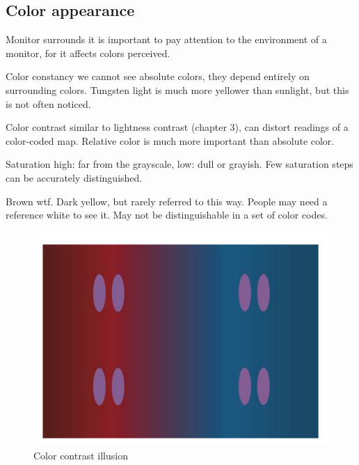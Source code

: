 \begin{mdframed}\begin{multicols}{2}
\subsection{Color appearance}
\begin{compactdesc}
    \item[Monitor surrounds] it is important to pay attention to the environment
        of a monitor, for it affects colors perceived.
    \item[Color constancy] we cannot see absolute colors, they depend entirely
        on surrounding colors. Tungsten light is much more yellower than
        sunlight, but this is not often noticed.
    \item[Color contrast] similar to lightness contrast (chapter 3), can
        distort readings of a color-coded map. Relative color is much more
        important than absolute color.
    \item[Saturation] high: far from the grayscale, low: dull or grayish.
        Few saturation steps can be accurately distinguished.
    \item[Brown] wtf. Dark yellow, but rarely referred to this way. People may
        need a reference white to see it. May not be distinguishable in a set
        of color codes.
\end{compactdesc}
\begin{figure}[H]
\centering
\includegraphics[width=0.4\linewidth]{color_contrast.png}
\caption{Color contrast illusion}
\end{figure}


\end{multicols}\end{mdframed}



